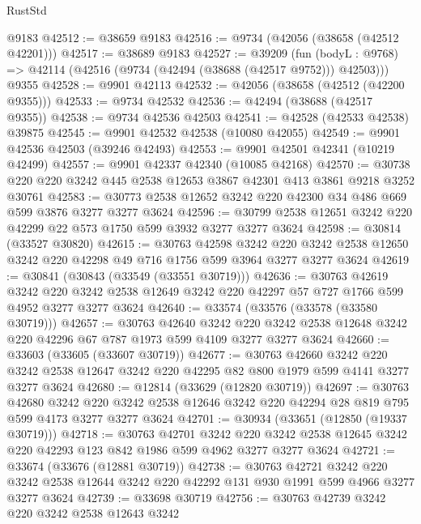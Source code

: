 \begin{lexlean}{RustStd}
\begin{coremodule}
    @9183
@42512 := @38659 @9183
@42516 := @9734 (@42056 (@38658 (@42512 @42201)))
@42517 := @38689 @9183
@42527 := @39209
    (fun (bodyL : @9768) => @42114 (@42516 (@9734 (@42494 (@38688 (@42517 @9752))) @42503)))
    @9355
@42528 := @9901 @42113
@42532 := @42056 (@38658 (@42512 (@42200 @9355)))
@42533 := @9734 @42532
@42536 := @42494 (@38688 (@42517 @9355))
@42538 := @9734 @42536 @42503
@42541 := @42528 (@42533 @42538) @39875
@42545 := @9901 @42532 @42538 (@10080 @42055)
@42549 := @9901 @42536 @42503 (@39246 @42493)
@42553 := @9901 @42501 @42341 (@10219 @42499)
@42557 := @9901 @42337 @42340 (@10085 @42168)
@42570 := @30738 @220 @220 @3242 @445 @2538 @12653 @3867 @42301 @413 @3861 @9218 @3252 @30761
@42583 := @30773 @2538 @12652 @3242 @220 @42300 @34 @486 @669 @599 @3876 @3277 @3277 @3624
@42596 := @30799 @2538 @12651 @3242 @220 @42299 @22 @573 @1750 @599 @3932 @3277 @3277 @3624
@42598 := @30814 (@33527 @30820)
@42615 := @30763
    @42598
    @3242
    @220
    @3242
    @2538
    @12650
    @3242
    @220
    @42298
    @49
    @716
    @1756
    @599
    @3964
    @3277
    @3277
    @3624
@42619 := @30841 (@30843 (@33549 (@33551 @30719)))
@42636 := @30763
    @42619
    @3242
    @220
    @3242
    @2538
    @12649
    @3242
    @220
    @42297
    @57
    @727
    @1766
    @599
    @4952
    @3277
    @3277
    @3624
@42640 := @33574 (@33576 (@33578 (@33580 @30719)))
@42657 := @30763
    @42640
    @3242
    @220
    @3242
    @2538
    @12648
    @3242
    @220
    @42296
    @67
    @787
    @1973
    @599
    @4109
    @3277
    @3277
    @3624
@42660 := @33603 (@33605 (@33607 @30719))
@42677 := @30763
    @42660
    @3242
    @220
    @3242
    @2538
    @12647
    @3242
    @220
    @42295
    @82
    @800
    @1979
    @599
    @4141
    @3277
    @3277
    @3624
@42680 := @12814 (@33629 (@12820 @30719))
@42697 := @30763
    @42680
    @3242
    @220
    @3242
    @2538
    @12646
    @3242
    @220
    @42294
    @28
    @819
    @795
    @599
    @4173
    @3277
    @3277
    @3624
@42701 := @30934 (@33651 (@12850 (@19337 @30719)))
@42718 := @30763
    @42701
    @3242
    @220
    @3242
    @2538
    @12645
    @3242
    @220
    @42293
    @123
    @842
    @1986
    @599
    @4962
    @3277
    @3277
    @3624
@42721 := @33674 (@33676 (@12881 @30719))
@42738 := @30763
    @42721
    @3242
    @220
    @3242
    @2538
    @12644
    @3242
    @220
    @42292
    @131
    @930
    @1991
    @599
    @4966
    @3277
    @3277
    @3624
@42739 := @33698 @30719
@42756 := @30763
    @42739
    @3242
    @220
    @3242
    @2538
    @12643
    @3242

\end{coremodule}
\end{lexlean}
